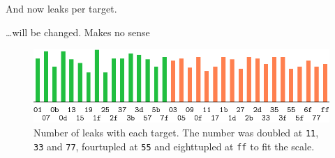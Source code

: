 	And now leaks per target. %
	
	\ldots will be changed. Makes no sense
	
	\begin{figure}[h]
	\begin{center}
		\includegraphics{figures/leak_target/plot.pdf}
		\caption{Number of leaks with each target. The number was doubled at {\tt 11}, {\tt 33} and {\tt 77}, fourtupled at {\tt 55} and eighttupled at {\tt ff} to fit the scale.}
		\label{fig:leaktargethist}
	\end{center}
	\end{figure}

